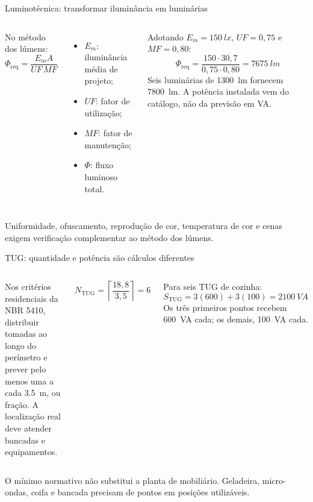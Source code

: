 \begin{frame}{Luminotécnica: transformar iluminância em luminárias}
\small
\begin{columns}[T,onlytextwidth]
No método dos lúmens:
\[
\Phi_{\mathrm{req}}=\frac{E_m A}{UF\,MF}
\]
\begin{itemize}
\item $E_m$: iluminância média de projeto;
\item $UF$: fator de utilização;
\item $MF$: fator de manutenção;
\item $\Phi$: fluxo luminoso total.
\end{itemize}
\begin{caixaEx}[title=Critério declarado para a sala]
Adotando $E_m=\SI{150}{lx}$, $UF=0{,}75$ e $MF=0{,}80$:
\[
\Phi_{\mathrm{req}}=\frac{150\cdot30{,}7}{0{,}75\cdot0{,}80}
=\SI{7675}{lm}
\]
Seis luminárias de \SI{1300}{lm} fornecem \SI{7800}{lm}. A potência instalada vem do catálogo, não da previsão em VA.
\end{caixaEx}
\end{columns}
\begin{caixaObs}
Uniformidade, ofuscamento, reprodução de cor, temperatura de cor e cenas exigem verificação complementar ao método dos lúmens.
\end{caixaObs}
\end{frame}

\begin{frame}{TUG: quantidade e potência são cálculos diferentes}
\small
\begin{columns}[T,onlytextwidth]
\begin{caixaNorma}[title=Cozinhas e locais análogos]
Nos critérios residenciais da NBR 5410, distribuir tomadas ao longo do perímetro e prever pelo menos uma a cada \SI{3.5}{m}, ou fração. A localização real deve atender bancadas e equipamentos.
\end{caixaNorma}
\[
N_{\mathrm{TUG}}=\left\lceil\frac{18{,}8}{3{,}5}\right\rceil=6
\]
\begin{caixaEx}[title=Potência de previsão]
Para seis TUG de cozinha:
\[
S_{\mathrm{TUG}}=3(600)+3(100)=\SI{2100}{VA}
\]
Os três primeiros pontos recebem \SI{600}{VA} cada; os demais, \SI{100}{VA} cada.
\end{caixaEx}
\end{columns}
\begin{caixaAt}
O mínimo normativo não substitui a planta de mobiliário. Geladeira, micro-ondas, coifa e bancada precisam de pontos em posições utilizáveis.
\end{caixaAt}
\end{frame}

